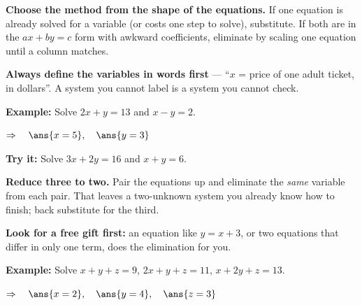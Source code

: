 \documentclass[12pt]{article}
\begin{document}


\begin{formulabox}
\textbf{Choose the method from the shape of the equations.} If one equation is already
solved for a variable (or costs one step to solve), substitute. If both are in the
$ax + by = c$ form with awkward coefficients, eliminate by scaling one equation until a
column matches.\par
\textbf{Always define the variables in words first} --- ``$x$ = price of one adult ticket, in
dollars''. A system you cannot label is a system you cannot check.
\end{formulabox}

\begin{examplebox}
\textbf{Example:} \quad Solve $2x + y = 13$ and $x - y = 2$.

$\Rightarrow\quad \ans{x = 5}, \quad \ans{y = 3}$
\end{examplebox}

\begin{tryitbox}
\textbf{Try it:} \quad Solve $3x + 2y = 16$ and $x + y = 6$.\\[2pt]
\end{tryitbox}


\begin{formulabox}
\textbf{Reduce three to two.} Pair the equations up and eliminate the \emph{same} variable
from each pair. That leaves a two-unknown system you already know how to finish; back
substitute for the third.\par
\textbf{Look for a free gift first:} an equation like $y = x + 3$, or two equations that
differ in only one term, does the elimination for you.
\end{formulabox}

\begin{examplebox}
\textbf{Example:} \quad Solve $x + y + z = 9$, $2x + y + z = 11$, $x + 2y + z = 13$.

$\Rightarrow\quad \ans{x = 2}, \quad \ans{y = 4}, \quad \ans{z = 3}$
\end{examplebox}
\end{document}
